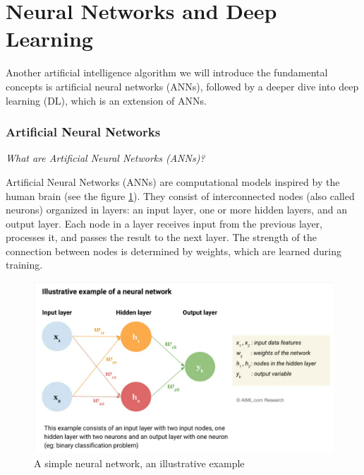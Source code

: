 \documentclass{llncs}
\begin{document}
\section{Neural Networks and Deep Learning}

Another artificial intelligence algorithm we will introduce the fundamental concepts is artificial neural networks (ANNs), followed by a deeper dive into deep learning (DL), which is an extension of ANNs.

\subsubsection{Artificial Neural Networks}

\textit{What are Artificial Neural Networks (ANNs)?}

Artificial Neural Networks (ANNs) are computational models inspired by the human brain (see the figure \ref{fig:neuronal}). They consist of interconnected nodes (also called neurons) organized in layers: an input layer, one or more hidden layers, and an output layer. Each node in a layer receives input from the previous layer, processes it, and passes the result to the next layer. The strength of the connection between nodes is determined by weights, which are learned during training.\cite{aiml2024}

\begin{figure}[h!]
	\begin{center}  %
		\includegraphics[width=1\textwidth]{images/neuronal.png}
		\caption{A simple neural network, an illustrative example\cite{aiml2024}}
		\label{fig:neuronal}
	\end{center}
\end{figure}

\vspace{-20pt} 
\end{document}
